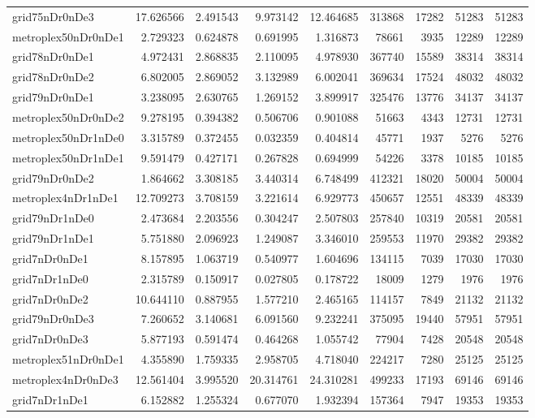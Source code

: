 \begin{longtable}{|l|r|r|r|r|r|r|r|r|}
grid75nDr0nDe3 & 17.626566 & 2.491543 & 9.973142 & 12.464685 & 313868 & 17282 & 51283 & 51283 \\
metroplex50nDr0nDe1 & 2.729323 & 0.624878 & 0.691995 & 1.316873 & 78661 & 3935 & 12289 & 12289 \\
grid78nDr0nDe1 & 4.972431 & 2.868835 & 2.110095 & 4.978930 & 367740 & 15589 & 38314 & 38314 \\
grid78nDr0nDe2 & 6.802005 & 2.869052 & 3.132989 & 6.002041 & 369634 & 17524 & 48032 & 48032 \\
grid79nDr0nDe1 & 3.238095 & 2.630765 & 1.269152 & 3.899917 & 325476 & 13776 & 34137 & 34137 \\
metroplex50nDr0nDe2 & 9.278195 & 0.394382 & 0.506706 & 0.901088 & 51663 & 4343 & 12731 & 12731 \\
metroplex50nDr1nDe0 & 3.315789 & 0.372455 & 0.032359 & 0.404814 & 45771 & 1937 & 5276 & 5276 \\
metroplex50nDr1nDe1 & 9.591479 & 0.427171 & 0.267828 & 0.694999 & 54226 & 3378 & 10185 & 10185 \\
grid79nDr0nDe2 & 1.864662 & 3.308185 & 3.440314 & 6.748499 & 412321 & 18020 & 50004 & 50004 \\
metroplex4nDr1nDe1 & 12.709273 & 3.708159 & 3.221614 & 6.929773 & 450657 & 12551 & 48339 & 48339 \\
grid79nDr1nDe0 & 2.473684 & 2.203556 & 0.304247 & 2.507803 & 257840 & 10319 & 20581 & 20581 \\
grid79nDr1nDe1 & 5.751880 & 2.096923 & 1.249087 & 3.346010 & 259553 & 11970 & 29382 & 29382 \\
grid7nDr0nDe1 & 8.157895 & 1.063719 & 0.540977 & 1.604696 & 134115 & 7039 & 17030 & 17030 \\
grid7nDr1nDe0 & 2.315789 & 0.150917 & 0.027805 & 0.178722 & 18009 & 1279 & 1976 & 1976 \\
grid7nDr0nDe2 & 10.644110 & 0.887955 & 1.577210 & 2.465165 & 114157 & 7849 & 21132 & 21132 \\
grid79nDr0nDe3 & 7.260652 & 3.140681 & 6.091560 & 9.232241 & 375095 & 19440 & 57951 & 57951 \\
grid7nDr0nDe3 & 5.877193 & 0.591474 & 0.464268 & 1.055742 & 77904 & 7428 & 20548 & 20548 \\
metroplex51nDr0nDe1 & 4.355890 & 1.759335 & 2.958705 & 4.718040 & 224217 & 7280 & 25125 & 25125 \\
metroplex4nDr0nDe3 & 12.561404 & 3.995520 & 20.314761 & 24.310281 & 499233 & 17193 & 69146 & 69146 \\
grid7nDr1nDe1 & 6.152882 & 1.255324 & 0.677070 & 1.932394 & 157364 & 7947 & 19353 & 19353 \\

\end{longtable}
